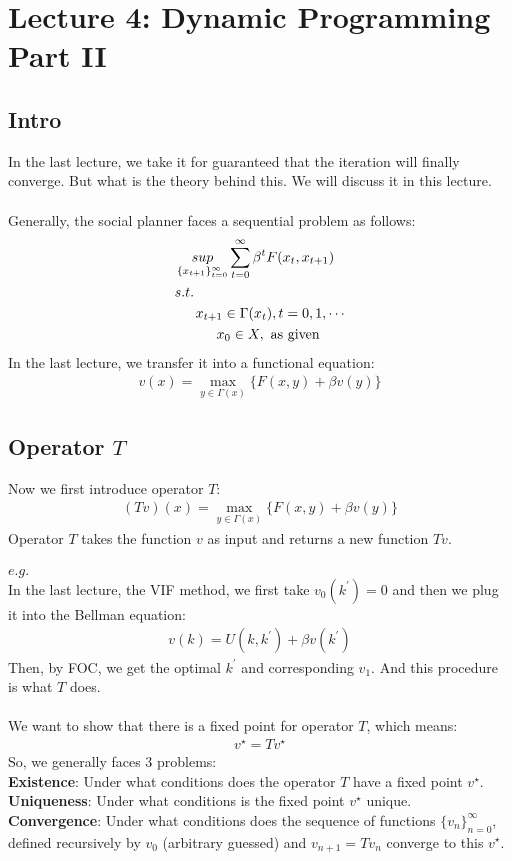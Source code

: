 \documentclass{article}
\begin{document}
\newpage
\section{Lecture 4: Dynamic Programming Part II}
\subsection{Intro}
In the last lecture, we take it for guaranteed that the iteration will finally converge. But what is the theory behind this. We will discuss it in this lecture.\\\\
Generally, the social planner faces a sequential problem as follows: 
\begin{align*}
	&\mathop{sup}\limits_{\{x_{t+1}\}^\infty_{t=0}} \sum\limits^\infty_{t=0} \beta^t F(x_t,  x_{t+1})\\
	&s.t.\\
	&\indent x_{t+1} \in \Gamma(x_t), t = 0, 1, \cdots\\
	&\indent\indent x_0 \in X,\ \text{as given}
\end{align*}
In the last lecture, we transfer it into a functional equation:
\begin{align*}
	v(x) = \mathop{max}\limits_{y \in \Gamma(x)} \{F(x, y) + \beta v(y)\}
\end{align*}


\subsection{Operator $T$}
Now we first introduce operator $T$:
\begin{align*}
	(Tv)(x) = \mathop{max}\limits_{y \in \Gamma(x)} \{F(x, y) + \beta v(y)\}
\end{align*}
Operator $T$ takes the function $v$ as input and returns a new function $Tv$.\\\\
$e.g.$\\
\indent In the last lecture, the VIF method, we first take $v_0(k^\prime) = 0$ and then we plug it into the Bellman equation:
\begin{align*}
	v(k) = U(k, k^\prime) + \beta v(k^\prime)
\end{align*}
\indent Then, by FOC, we get the optimal $k^\prime$ and corresponding $v_1$. And this procedure is what $T$ does.\\\\
We want to show that there is a fixed point for operator $T$, which means:
\begin{align*}
	v^\star = T v^\star
\end{align*}
So, we generally faces 3 problems:\\
\indent \textbf{Existence}: Under what conditions does the operator $T$ have a fixed point $v^\star$.\\
\indent \textbf{Uniqueness}: Under what conditions is the fixed point $v^\star$ unique.\\
\indent \textbf{Convergence}: Under what conditions does the sequence of functions $\{v_n\}^\infty_{n=0}$, defined recursively by $v_0$ (arbitrary guessed) and $v_{n+1} = Tv_n$ converge to this $v^\star$.
\end{document}
